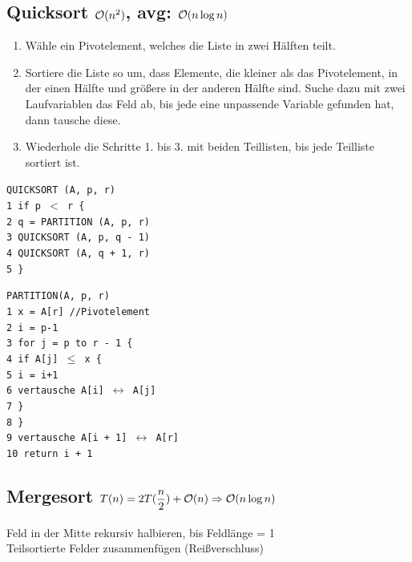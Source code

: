 \documentclass[fs, footer]{latex4ei}
\renewcommand{\t}{\texttt}
\begin{document}
\begin{multicols*}{4}
{{\subsection{Quicksort $\operatorname{\mathcal O}(n^2)$, avg: $\operatorname{\mathcal O}(n\log n)$}
\begin{enumerate}
	\item Wähle ein Pivotelement, welches die Liste in zwei Hälften teilt. 
	\item Sortiere die Liste so um, dass Elemente, die kleiner als das Pivotelement, in der einen Hälfte und größere in der anderen Hälfte sind. 
		Suche dazu mit zwei Laufvariablen das Feld ab, bis jede eine unpassende Variable gefunden hat, dann tausche diese.
	\item Wiederhole die Schritte 1. bis 3. mit beiden Teillisten, bis jede Teilliste sortiert ist.
\end{enumerate}

\parbox{4cm}{
\t{QUICKSORT (A, p, r)\\
1\ if p $<$ r \{\\
2\ \quad q = PARTITION (A, p, r)\\
3\ \quad QUICKSORT (A, p, q - 1)\\
4\ \quad QUICKSORT (A, q + 1, r)\\
5\ \}
}}\hspace{-.5cm}
\parbox{4cm}{
\t{PARTITION(A, p, r)\\
1\ x = A[r] //Pivotelement\\
2\ i = p-1 \\
3\ for j = p to r - 1 \{\\
4\ \quad if A[j] $\le$ x \{\\
5\ \qquad i = i+1\\
6\ \qquad vertausche A[i] $\leftrightarrow$ A[j]\\
7\ \quad \}\\
8\ \}\\
9\ vertausche A[i + 1] $\leftrightarrow$ A[r]\\
10\ return i + 1\\}}

\subsection{Mergesort $T(n) = 2T(\dfrac{n}{2}) + \operatorname{\mathcal O}(n) \Rightarrow \operatorname{\mathcal O}(n\log n)$}
Feld in der Mitte rekursiv halbieren, bis Feldlänge = 1\\
Teilsortierte Felder zusammenfügen (Reißverschluss)\\

}}
\end{multicols*}
\end{document}
